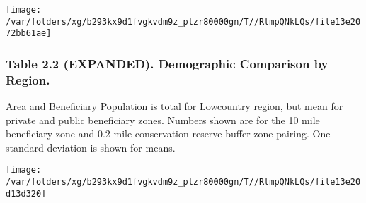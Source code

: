 \documentclass[landscape]{article}
\begin{document}
\texttt{[image: /var/folders/xg/b293kx9d1fvgkvdm9z\_plzr80000gn/T//RtmpQNkLQs/file13e2072bb61ae]}
\pagebreak

\hypertarget{table-2.2-expanded.-demographic-comparison-by-region.}{%
\subsubsection{Table 2.2 (EXPANDED). Demographic Comparison by
Region.}\label{table-2.2-expanded.-demographic-comparison-by-region.}}

Area and Beneficiary Population is total for Lowcountry region, but mean
for private and public beneficiary zones. Numbers shown are for the 10
mile beneficiary zone and 0.2 mile conservation reserve buffer zone
pairing. One standard deviation is shown for means.

\texttt{[image: /var/folders/xg/b293kx9d1fvgkvdm9z\_plzr80000gn/T//RtmpQNkLQs/file13e20d13d320]}
\end{document}
